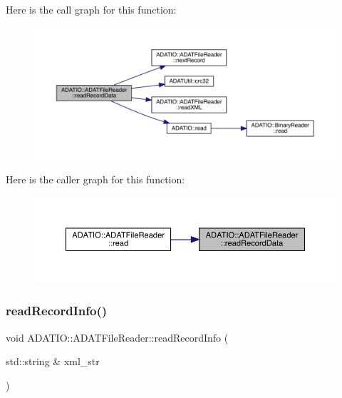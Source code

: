 Here is the call graph for this function\+:\nopagebreak
\begin{figure}[H]
\begin{center}
\leavevmode
\includegraphics[width=350pt]{db/de5/group__qio_ga525c9902a7ee7ebe41c688897da0652e_cgraph}
\end{center}
\end{figure}
Here is the caller graph for this function\+:\nopagebreak
\begin{figure}[H]
\begin{center}
\leavevmode
\includegraphics[width=350pt]{db/de5/group__qio_ga525c9902a7ee7ebe41c688897da0652e_icgraph}
\end{center}
\end{figure}
\mbox{\label{group__qio_gade5b9d659e34ec9c9de267858a675d7d}} 
\subsubsection{\texorpdfstring{readRecordInfo()}{readRecordInfo()}\hspace{0.1cm}{\footnotesize\ttfamily [1/2]}}
{\footnotesize\ttfamily void A\+D\+A\+T\+I\+O\+::\+A\+D\+A\+T\+File\+Reader\+::read\+Record\+Info (\begin{DoxyParamCaption}\item[{std\+::string \&}]{xml\+\_\+str }\end{DoxyParamCaption})\hspace{0.3cm}{\ttfamily [protected]}}




